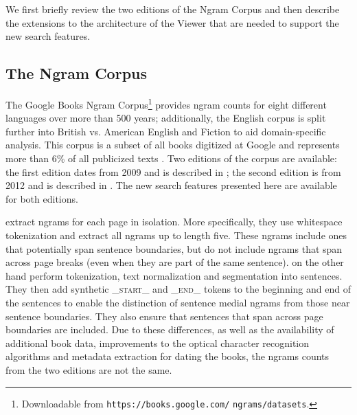 \documentclass[11pt,a4paper]{article}
\begin{document}
We first briefly review the two editions of the Ngram Corpus \cite{culturomics,lin2012syntactic} and then describe the extensions to the architecture of the Viewer that are needed to support the new search features.


\subsection{The Ngram Corpus}
	The Google Books Ngram Corpus\footnote{Downloadable from \texttt{https://books.google.com/} \texttt{ngrams/datasets}.} provides ngram counts for eight different languages over more than 500 years; additionally, the English corpus is split further into British vs. American English and Fiction to aid domain-specific analysis. This corpus is a subset of all books digitized at Google and represents more than 6\% of all publicized texts \cite{lin2012syntactic}. Two editions of the corpus are available: the first edition dates from 2009 and is described in ; the second edition is from 2012 and is described in . The new search features presented here are available for both editions.

 extract ngrams for each page in isolation. More specifically, they use whitespace tokenization and extract all ngrams up to length five. These ngrams include ones that potentially span sentence boundaries, but do not include ngrams that span across page breaks (even when they are part of the same sentence).
 on the other hand perform tokenization, text normalization and segmentation into sentences. They then add synthetic \textsf{\textsc{\_start\_}} and \textsf{\textsc{\_end\_}} tokens to the beginning and end of the sentences to enable the distinction of sentence medial ngrams from those near sentence boundaries. They also ensure that sentences that span across page boundaries are included. Due to these differences, as well as the availability of additional book data, improvements to the optical character recognition algorithms and metadata extraction for dating the books, the ngrams counts from the two editions are not the same.
\end{document}
